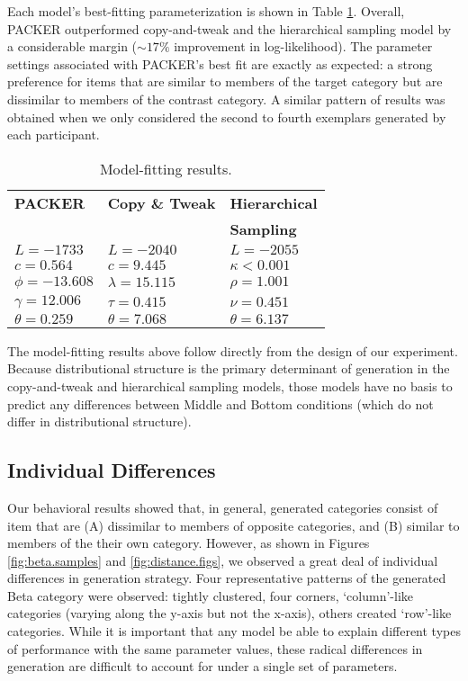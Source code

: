 \documentclass[10pt,letterpaper]{article}
\begin{document}
Each model's best-fitting parameterization is shown in Table \ref{table:model-fits}. Overall, PACKER outperformed copy-and-tweak and the hierarchical sampling model by a considerable margin ($\sim17\%$ improvement in log-likelihood). The parameter settings associated with PACKER's best fit are exactly as expected: a strong preference for items that are similar to members of the target category but are dissimilar to members of the contrast category. A similar pattern of results was obtained when we only considered the second to fourth exemplars generated by each participant.
\begin{table}[ht!]
\centering
\caption{Model-fitting results.}
\label{table:model-fits}
\begin{tabular}{ l l l}
\\
 \textbf{PACKER} & \textbf{Copy \& Tweak} & \textbf{Hierarchical} \\
 & & \textbf{Sampling} \\ \hline
 $L = -1733$ & $L = -2040$ & $L = -2055$  \\ 
 $c=0.564$ & $c=9.445$  & $\kappa<0.001$\\
$\phi=-13.608$& $\lambda=15.115$ & $\rho=1.001$ \\ 
$\gamma=12.006$  & $\tau=0.415$ & $\nu=0.451$  \\ 
 $\theta=0.259$  & $\theta=7.068$ & $\theta=6.137$  \\ 
\end{tabular}
\end{table}

The model-fitting results above follow directly from the design of our experiment. Because distributional structure is the primary determinant of generation in the copy-and-tweak and hierarchical sampling models, those models have no basis to predict any differences between Middle and Bottom conditions (which do not differ in distributional structure). 

\subsection{Individual Differences}

Our behavioral results showed that, in general, generated categories consist of item that are (A) dissimilar to members of opposite categories, and (B) similar to members of the their own category. However, as shown in Figures \ref{fig:beta.samples} and \ref{fig:distance.figs}, we observed a great deal of individual differences in generation strategy. Four representative patterns of the generated Beta category were observed: tightly clustered, four corners, `column'-like categories (varying along the y-axis but not the x-axis), others created `row'-like categories. While it is important that any model be able to explain different types of performance with the same parameter values, these radical differences in generation are difficult to account for under a single set of parameters.
\end{document}
